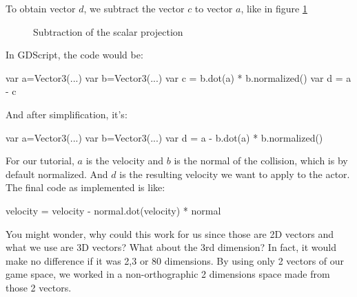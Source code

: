 \documentclass[10pt,a4paper]{article}
\begin{document}
To obtain vector $d$, we subtract the vector $c$ to vector $a$, like in figure \ref{fig:scalar_substraction}
\begin{figure}[H]
\centering
{}
\caption{Subtraction of the scalar projection}
\label{fig:scalar_substraction}
\end{figure}
In GDScript, the code would be:
\begin{pythoncode}
  var a=Vector3(...)
  var b=Vector3(...)
  var c = b.dot(a) * b.normalized()
  var d = a - c
\end{pythoncode}
And after simplification, it's:
\begin{pythoncode}
  var a=Vector3(...)
  var b=Vector3(...)
  var d = a - b.dot(a) * b.normalized()
\end{pythoncode}

For our tutorial, $a$ is the velocity and $b$ is the normal of the collision, which is by default normalized. And $d$ is the resulting velocity we want to apply to the actor. The final code as implemented is like:
\begin{pythoncode}
  velocity = velocity - normal.dot(velocity) * normal
\end{pythoncode}

You might wonder, why could this work for us since those are 2D vectors and what we use are 3D vectors? What about the 3rd dimension? In fact, it would make no difference if it was 2,3 or 80 dimensions. By using only 2 vectors of our game space, we worked in a non-orthographic 2 dimensions space made from those 2 vectors.
\end{document}
